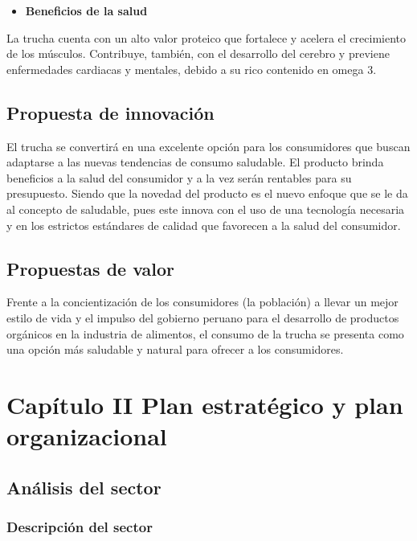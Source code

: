 \documentclass[
  stu,
  floatsintext,
  longtable,
  a4paper,
  nolmodern,
  notxfonts,
  notimes,
  colorlinks=true,linkcolor=blue,citecolor=blue,urlcolor=blue]{apa7}
\providecommand{\tightlist}{%
  \setlength{\itemsep}{0pt}\setlength{\parskip}{0pt}}
\begin{document}
\begin{itemize}
\tightlist
\item
  \hspace{0pt} \textbf{Beneficios de la salud}
\end{itemize}

La trucha cuenta con un alto valor proteico que fortalece y acelera el
crecimiento de los músculos. Contribuye, también, con el desarrollo del
cerebro y previene enfermedades cardiacas y mentales, debido a su rico
contenido en omega 3.

\subsection{Propuesta de innovación}\label{propuesta-de-innovaciuxf3n}

El trucha se convertirá en una excelente opción para los consumidores
que buscan adaptarse a las nuevas tendencias de consumo saludable. El
producto brinda beneficios a la salud del consumidor y a la vez serán
rentables para su presupuesto. Siendo que la novedad del producto es el
nuevo enfoque que se le da al concepto de saludable, pues este innova
con el uso de una tecnología necesaria y en los estrictos estándares de
calidad que favorecen a la salud del consumidor.

\subsection{Propuestas de valor}\label{propuestas-de-valor}

Frente a la concientización de los consumidores (la población) a llevar
un mejor estilo de vida y el impulso del gobierno peruano para el
desarrollo de productos orgánicos en la industria de alimentos, el
consumo de la trucha se presenta como una opción más saludable y natural
para ofrecer a los consumidores.

\section{Capítulo II Plan estratégico y plan
organizacional}\label{capuxedtulo-ii-plan-estratuxe9gico-y-plan-organizacional}

\subsection{Análisis del sector}\label{anuxe1lisis-del-sector}

\subsubsection{Descripción del sector}\label{descripciuxf3n-del-sector}
\end{document}
